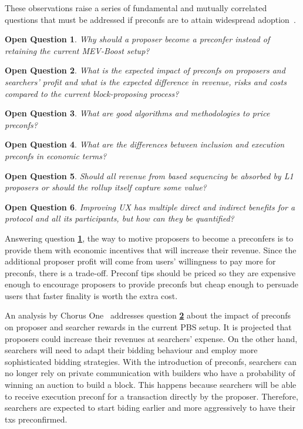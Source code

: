 \documentclass[conference]{IEEEtran}
\theoremstyle{boldstyle}
\newtheorem{openquestionx}{Open Question}
\newenvironment{openquestion}
  {\begin{openboxq}\begin{openquestionx}}
  {\end{openquestionx}\end{openboxq}}
\begin{document}
    These observations raise a series of fundamental and mutually correlated questions that must be addressed if preconfs are to attain widespread adoption~\cite{W:EconomicViabilityofPreconfirmations}. 
    \begin{openquestion} \label{Q_why_proposer}
    Why should a proposer become a preconfer instead of retaining the current MEV-Boost setup?
    \end{openquestion}
    \begin{openquestion} \label{Q_impact}
    {What is the expected impact of preconfs on proposers and searchers' profit and what is the expected difference in revenue, risks and costs compared to the current block-proposing process?}
    \end{openquestion}
    \begin{openquestion} \label{Q_pricing}
    {What are good algorithms and methodologies to price preconfs?}
    \end{openquestion}
    \begin{openquestion} \label{Q_diffs_inc_exec}
    {What are the differences between inclusion and execution preconfs in economic terms?}
    \end{openquestion}
    \begin{openquestion} \label{Q_based_seq_profit}
    Should all revenue from based sequencing be absorbed by L1 proposers or should the rollup itself capture some value?
    \end{openquestion}
    \begin{openquestion} \label{Q_quantify_benefits}
    {Improving UX has multiple direct and indirect benefits for a protocol and all its participants, but how can they be quantified?}
    \end{openquestion}

    Answering question \textbf{\ref{Q_why_proposer}}, the way to motive proposers to become a preconfers is to provide them with economic incentives that will increase their revenue. Since the additional proposer profit will come from users' willingness to pay more for preconfs, there is a trade-off. Preconf tips should be priced so they are expensive enough to encourage proposers to provide preconfs but cheap enough to persuade users that faster finality is worth the extra cost.  

    An analysis by Chorus One~\cite{W:PreconfirmationsundertheNOlens} addresses question \textbf{\ref{Q_impact}} about the impact of preconfs on proposer and searcher rewards in the current PBS setup. It is projected that proposers could increase their revenues at searchers' expense. On the other hand, searchers will need to adapt their bidding behaviour and employ more sophisticated bidding strategies. With the introduction of preconfs, searchers can no longer rely on private communication with builders who have a probability of winning an auction to build a block. This happens because searchers will be able to receive execution preconf for a transaction directly by the proposer. Therefore, searchers are expected to start biding earlier and more aggressively to have their txs preconfirmed.
\end{document}
